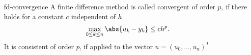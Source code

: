 \begin{Definition}{fd-convergence}
  A finite difference method is called convergent of order $p$, if
  there holds for a constant $c$ independent of $h$
  \begin{gather}
    \label{eq:fd-convergence:1}
    \max_{0\le k\le n}\abs{u_k - y_k} \le c h^p.
  \end{gather}
  It is consistent of order $p$, if applied to the vector
  $u = (u_0,\dots,u_n)^T$
\end{Definition}

